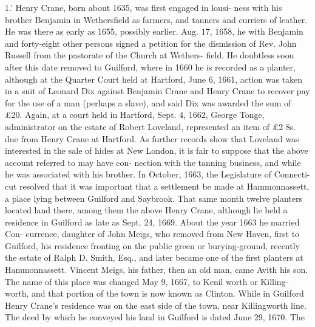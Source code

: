 \documentclass{book}
\begin{document}
1.' Henry Crane, born about 1635, was first engaged in lousi- 
ness with his brother Benjamin in Wethersfield as farmers, and 
tanners and curriers of leather. He was there as early as 
1655, possibly earlier. Aug. 17, 1658, he with Benjamin and 
forty-eight other persons signed a petition for the dismission of 
Rev. John Russell from the pastorate of the Church at Wethers- 
field. He doubtless soon after this date removed to Guilford, 
where in 1660 he is recorded as a planter, although at the 
Quarter Court held at Hartford, June 6, 1661, action was taken 
in a suit of Leonard Dix against Benjamin Crane and Henry 
Crane to recover pay for the use of a man (perhaps a slave), and 
said Dix was awarded the sum of £20. Again, at a court held 
in Hartford, Sept. 4, 1662, George Tonge, administrator on the 
estate of Robert Loveland, represented an item of £2 8s. due 
from Henry Crane at Hartford. As further records show that 
Loveland was interested in the sale of hides at New London, it is 
fair to suppose that the above account referred to may have con- 
nection with the tanning business, and while he was associated 
with his brother. In October, 1663, the Legislature of Connecti- 
cut resolved that it was important that a settlement be made at 
Hammonnassett, a place lying between Guilford and Saybrook. 
That same month twelve planters located land there, among them 
the above Henry Crane, although lie held a residence in Guilford 
as late as Sept. 24, 1669. About the year 1663 he married Con- 
currence, daughter of John Meigs, who removed from New 
Haven, first to Guilford, his residence fronting on the public 
green or burying-ground, recently the estate of Ralph D. Smith, 
Esq., and later became one of the first planters at Hanunonnassett. 
Vincent Meigs, his father, then an old man, came Avith his son. 
The name of this place was changed May 9, 1667, to Kenil worth 
or Killing-worth, and that portion of the town is now known as 
Clinton. While in Guilford Henry Crane's residence was on the 
east side of the town, near Killingworth line. The deed by which 
he conveyed his land in Guilford is dated June 29, 1670. The 
\end{document}
